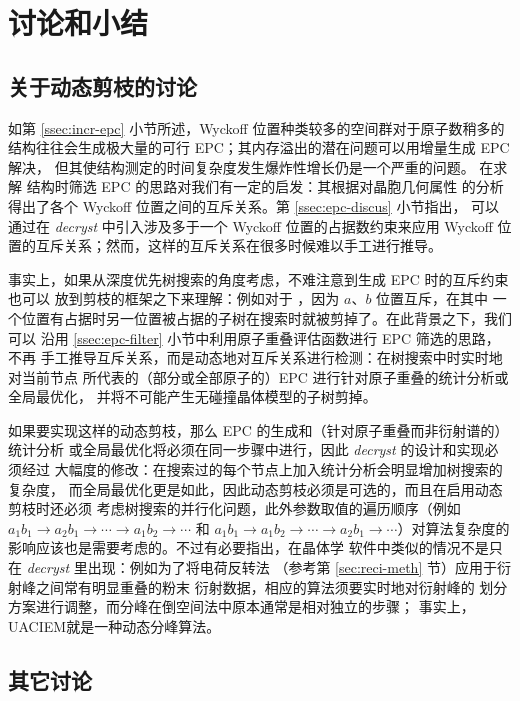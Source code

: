 \section{讨论和小结}
\subsection{关于动态剪枝的讨论}\label{ssec:prune-discus}

如第 \ref{ssec:incr-epc} 小节所述，Wyckoff 位置种类较多的空间群对于原子数稍多的
结构往往会生成极大量的可行 EPC；其内存溢出的潜在问题可以用增量生成 EPC 解决，
但其使结构测定的时间复杂度发生爆炸性增长仍是一个严重的问题。\textcite{lu1965}%
在求解  结构时筛选 EPC 的思路对我们有一定的启发：其根据对晶胞几何属性
的分析得出了各个 Wyckoff 位置之间的互斥关系。第 \ref{ssec:epc-discus} 小节指出，
可以通过在 \emph{decryst} 中引入涉及多于一个 Wyckoff 位置的占据数约束来应用
Wyckoff 位置的互斥关系；然而，这样的互斥关系在很多时候难以手工进行推导。

事实上，如果从深度优先树搜索的角度考虑，不难注意到生成 EPC 时的互斥约束也可以
放到剪枝的框架之下来理解：例如对于 ，因为 $a$、$b$ 位置互斥，在其中
一个位置有占据时另一位置被占据的子树在搜索时就被剪掉了。在此背景之下，我们可以
沿用 \ref{ssec:epc-filter} 小节中利用原子重叠评估函数进行 EPC 筛选的思路，不再
手工推导互斥关系，而是动态地对互斥关系进行检测：在树搜索中时实时地对当前节点
所代表的（部分或全部原子的）EPC 进行针对原子重叠的统计分析或全局最优化，
并将不可能产生无碰撞晶体模型的子树剪掉。

如果要实现这样的动态剪枝，那么 EPC 的生成和（针对原子重叠而非衍射谱的）统计分析
或全局最优化将必须在同一步骤中进行，因此 \emph{decryst} 的设计和实现必须经过
大幅度的修改：在搜索过的每个节点上加入统计分析会明显增加树搜索的复杂度，
而全局最优化更是如此，因此动态剪枝必须是可选的，而且在启用动态剪枝时还必须
考虑树搜索的并行化问题，此外参数取值的遍历顺序（例如 $a_1b_1 \rightarrow
a_2b_1 \rightarrow \cdots \rightarrow a_1b_2 \rightarrow \cdots$ 和
$a_1b_1 \rightarrow a_1b_2 \rightarrow \cdots \rightarrow a_2b_1 \rightarrow
\cdots$）对算法复杂度的影响应该也是需要考虑的。不过有必要指出，在晶体学
软件中类似的情况不是只在 \emph{decryst} 里出现：例如为了将电荷反转法
（参考第 \ref{sec:reci-meth} 节）应用于衍射峰之间常有明显重叠的粉末
衍射数据，相应的算法\parencite{baerlocher2007}须要实时地对衍射峰的
划分方案进行调整，而分峰在倒空间法中原本通常是相对独立的步骤；
事实上，UACIEM\parencite{ma2004}就是一种动态分峰算法。

\subsection{其它讨论}

